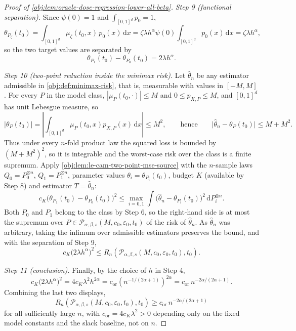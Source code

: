 \begin{proof}[Proof of \cref{obj:lem:oracle-dose-regression-lower-all-beta}]
\emph{Step 9 (functional separation).} Since \(\psi(0)=1\) and \(\int_{[0,1]^d}p_0=1\),
\[
\theta_{P_\zeta}(t_0)
=
\int_{[0,1]^d}\mu_\zeta(t_0,x)\,p_0(x)\,\mathrm dx
=
\zeta\lambda h^{\alpha}\psi(0)\int_{[0,1]^d}p_0(x)\,\mathrm dx
=
\zeta\lambda h^{\alpha},
\]
so the two target values are separated by
\[
\theta_{P_1}(t_0)-\theta_{P_0}(t_0)
=
2\lambda h^{\alpha}.
\]

\emph{Step 10 (two-point reduction inside the minimax risk).} Let \(\hat\theta_n\) be any estimator
admissible in \cref{obj:def:minimax-risk}, that is, measurable with values in \([-M,M]\). For every
\(P\) in the model class, \(|\mu_P(t_0,\cdot)|\le M\) and \(0\le p_{X,P}\le M\), and \([0,1]^d\) has
unit Lebesgue measure, so
\[
|\theta_P(t_0)|
=
\left|\int_{[0,1]^d}\mu_P(t_0,x)p_{X,P}(x)\,\mathrm dx\right|
\le
M^2,
\qquad\text{hence}\qquad
\bigl|\hat\theta_n-\theta_P(t_0)\bigr|\le M+M^2 .
\]
Thus under every \(n\)-fold product law the squared loss is bounded by \((M+M^2)^2\), so it is
integrable and the worst-case risk over the class is a finite supremum. Apply
\cref{obj:lem:le-cam-two-point-mse-source} with the \(n\)-sample laws \(Q_0=P_0^{\otimes n}\),
\(Q_1=P_1^{\otimes n}\), parameter values \(\theta_i=\theta_{P_i}(t_0)\), budget \(K\) (available by
Step 8) and estimator \(T=\hat\theta_n\):
\[
c_K\bigl(\theta_{P_1}(t_0)-\theta_{P_0}(t_0)\bigr)^2
\le
\max_{i=0,1}
\int\bigl(\hat\theta_n-\theta_{P_i}(t_0)\bigr)^2\,\mathrm dP_i^{\otimes n} .
\]
Both \(P_0\) and \(P_1\) belong to the class by Step 6, so the right-hand side is at most the
supremum over \(P\in\mathcal P_{\alpha,\beta,s}(M,c_0,\varepsilon_0,t_0)\) of the risk of
\(\hat\theta_n\). As \(\hat\theta_n\) was arbitrary, taking the infimum over admissible estimators
preserves the bound, and with the separation of Step 9,
\[
c_K\bigl(2\lambda h^{\alpha}\bigr)^2
\le
R_n\!\left(\mathcal P_{\alpha,\beta,s}(M,c_0,\varepsilon_0,t_0),t_0\right).
\]

\emph{Step 11 (conclusion).} Finally, by the choice of \(h\) in Step 4,
\[
c_K\bigl(2\lambda h^{\alpha}\bigr)^2
=
4c_K\lambda^2h^{2\alpha}
=
c_{\mathrm{or}}\left(n^{-1/(2\alpha+1)}\right)^{2\alpha}
=
c_{\mathrm{or}}\,n^{-2\alpha/(2\alpha+1)} .
\]
Combining the last two displays,
\[
R_n\!\left(\mathcal P_{\alpha,\beta,s}(M,c_0,\varepsilon_0,t_0),t_0\right)
\ge
c_{\mathrm{or}}\,n^{-2\alpha/(2\alpha+1)}
\]
for all sufficiently large \(n\), with \(c_{\mathrm{or}}=4c_K\lambda^2>0\) depending only on the
fixed model constants and the slack baseline, not on \(n\).
\end{proof}
